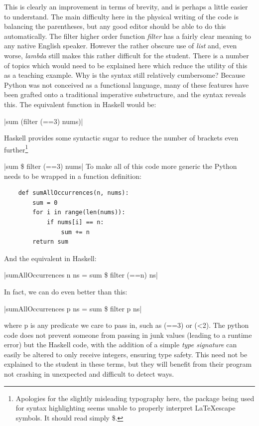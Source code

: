 \documentclass[12pt, a4paper]{report}
\begin{document}
This is clearly an improvement in terms of brevity, and is perhaps a little easier to understand.
The main difficulty here in the physical writing of the code is balancing the parentheses,
but any good editor should be able to do this automatically. The filter higher order function
\textit{filter} has a fairly clear meaning to any native English speaker. However the rather obscure
use of \textit{list} and, even worse, \textit{lambda} still makes this rather difficult for the
student. There is a number of topics which would need to be explained here which reduce the utility
of this as a teaching example. Why is the syntax still relatively cumbersome? Because Python was
not conceived as a functional language, many of these features have been grafted onto a traditional
imperative substructure, and the syntax reveals this. The equivalent function in Haskell would be:

|sum (filter (==3) nums)|

Haskell provides some syntactic sugar to reduce the number of brackets even
further\footnote{Apologies for the slightly misleading typography here, the package being used for
syntax highlighting seems unable to properly interpret \LaTeX escape symbols. It should read simply
\$.}

|sum \$ filter (==3) nums|    
To make all of this code more generic the Python needs to be wrapped in a function definition:

\begin{verbatim}
    def sumAllOccurrences(n, nums):
        sum = 0
        for i in range(len(nums)):
            if nums[i] == n:
                sum += n
        return sum
\end{verbatim}

And the equivalent in Haskell:

|sumAllOccurrences n ns = sum \$ filter (==n) ns|

In fact, we can do even better than this:

|sumAllOccurrences p ns = sum \$ filter p ns|

where p is any predicate we care to pass in, such as (==3) or (\textless2). The python code does not
prevent someone from passing in junk values (leading to a runtime error) but the Haskell code, with
the addition of a simple \textit{type signature} can easily be altered to only receive integers,
ensuring type safety. This need not be explained to the student in these terms, but they will
benefit from their program not crashing in unexpected and difficult to detect ways.
\end{document}
